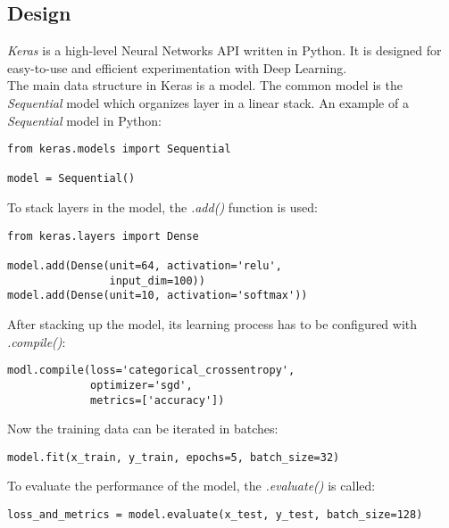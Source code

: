 
\subsection{Design}


\textit{Keras} is a high-level Neural Networks API written in Python. It is
designed for easy-to-use and efficient experimentation with Deep
Learning.~\cite{chollet2015keras}\\


The main data structure in Keras is a model. The common model is the
\textit{Sequential} model which organizes layer in a linear stack. An example of
a \textit{Sequential} model in Python:

\begin{lstlisting}
from keras.models import Sequential

model = Sequential()
\end{lstlisting}

\noindent To stack layers in the model, the \textit{.add()} function is used:

\begin{lstlisting}
from keras.layers import Dense

model.add(Dense(unit=64, activation='relu', 
                input_dim=100))
model.add(Dense(unit=10, activation='softmax'))
\end{lstlisting}

\noindent After stacking up the model, its learning process has to be configured
with \textit{.compile()}:

\begin{lstlisting}
modl.compile(loss='categorical_crossentropy', 
             optimizer='sgd',
             metrics=['accuracy'])
\end{lstlisting}

\noindent Now the training data can be iterated in batches:

\begin{lstlisting}
model.fit(x_train, y_train, epochs=5, batch_size=32)
\end{lstlisting}

\noindent To evaluate the performance of the model, the \textit{.evaluate()} is
called:

\begin{lstlisting}
loss_and_metrics = model.evaluate(x_test, y_test, batch_size=128)
\end{lstlisting}
